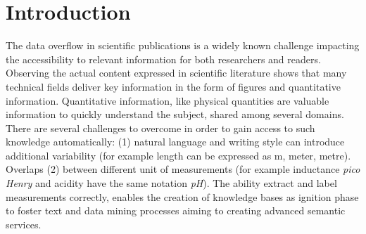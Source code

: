 \documentclass[sigconf]{acmart}
\begin{document}


\maketitle

\section{Introduction}

The data overflow in scientific publications is a widely known challenge impacting the accessibility to relevant information for both researchers and readers. 
Observing the actual content expressed in scientific literature shows that many technical fields deliver key information in the form of figures and quantitative information. Quantitative information, like physical quantities are valuable information to quickly understand the subject, shared among several domains. There are several challenges to overcome in order to gain access to such knowledge automatically: (1) natural language and writing style can introduce additional variability (for example length can be expressed as m, meter, metre). Overlaps (2) between different unit of measurements (for example inductance \textit{pico Henry} and acidity have the same notation \textit{pH}). The ability extract and label measurements correctly, enables the creation of knowledge bases as ignition phase to foster text and data mining processes aiming to creating advanced semantic services. 
\end{document}
